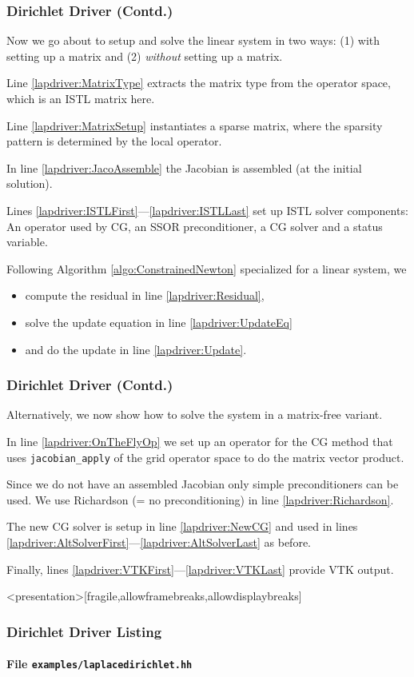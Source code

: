 \begin{frame}
\frametitle<presentation>{Dirichlet Driver (Contd.)}
Now we go about to setup and solve the linear system in two ways:
(1) with setting up a matrix and (2) \textit{without} setting up a
matrix. 

Line \ref{lapdriver:MatrixType} extracts the matrix type from the
operator space, which is an ISTL matrix here.

Line \ref{lapdriver:MatrixSetup} instantiates a sparse matrix, where
the sparsity pattern is determined by the local operator.

In line \ref{lapdriver:JacoAssemble} the Jacobian is assembled (at the
initial solution).

Lines \ref{lapdriver:ISTLFirst}---\ref{lapdriver:ISTLLast} set up ISTL
solver components: An operator used by CG, an SSOR preconditioner, a
CG solver and a status variable.

Following Algorithm \ref{algo:ConstrainedNewton} specialized for a
linear system, we 
\begin{itemize}
\item compute the residual in line \ref{lapdriver:Residual},
\item solve the update equation in line \ref{lapdriver:UpdateEq}
\item and do the update in line \ref{lapdriver:Update}.
\end{itemize}
\end{frame}

\begin{frame}
\frametitle<presentation>{Dirichlet Driver (Contd.)}
Alternatively, we now show how to solve the system in a matrix-free
variant. 

In line \ref{lapdriver:OnTheFlyOp} we set up an operator for the CG
method that uses \lstinline{jacobian_apply} of the grid operator space
to do the matrix vector product.

Since we do not have an assembled Jacobian only simple preconditioners
can be used. We use Richardson (= no preconditioning) in
line \ref{lapdriver:Richardson}. 

The new CG solver is setup in line \ref{lapdriver:NewCG} and used in
lines \ref{lapdriver:AltSolverFirst}---\ref{lapdriver:AltSolverLast}
as before.

Finally, lines \ref{lapdriver:VTKFirst}---\ref{lapdriver:VTKLast}
provide VTK output.
\end{frame}

\begin{frame}<presentation>[fragile,allowframebreaks,allowdisplaybreaks]
\frametitle<presentation>{Dirichlet Driver Listing}
\framesubtitle<presentation>{File \texttt{examples/laplacedirichlet.hh}}

\end{frame}

